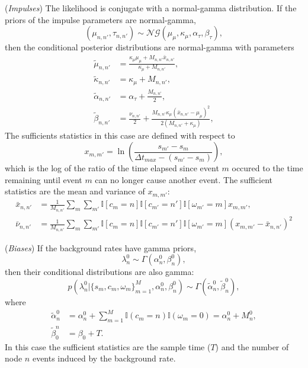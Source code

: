 (\textit{Impulses}) The likelihood is conjugate with a normal-gamma distribution. If the priors of the impulse parameters are normal-gamma,
\begin{equation}
	(\mu_{n,n'}, \tau_{n,n'}) \sim \mathcal{NG} (\mu_\mu, \kappa_\mu, \alpha_\tau, \beta_\tau),
\end{equation}
then the conditional posterior distributions are normal-gamma with parameters
\begin{align}
	\tilde{\mu}_{n,n'} &= \frac{\kappa_\mu \mu_\mu + M_{n,n'}\bar{x}_{n,n'}}{\kappa_\mu + M_{n,n'}}, \\
	\tilde{\kappa}_{n,n'} &= \kappa_{\mu} + M_{n,n'}, \\
	\tilde{\alpha}_{n,n'} &= \alpha_\tau + \frac{M_{n,n'}}{2}, \\
	\tilde{\beta}_{n,n'} &= \frac{\nu_{n,n'}}{2} + \frac{M_{n,n'} \kappa_\mu (\bar{x}_{n,n'} - \mu_\mu)^2}{2(M_{n,n'} + \kappa_\mu)},
\end{align}
The sufficients statistics in this case are defined with respect to
\begin{equation}
	x_{m,m'} = \ln \left( \frac{s_{m'} - s_m}{\Delta t_{max} - (s_{m'} - s_m)} \right),
\end{equation}
which is the log of the ratio of the time elapsed since event $m$ occured to the time remaining until event $m$ can no longer cause another event. The sufficient statistics are the mean and variance of $x_{m,m'}$:
\begin{align}
	\bar{x}_{n,n'} &= \frac{1}{M_{n,n'}} \sum_m \sum_{m'} \mathbb{I}\left[ c_m = n \right] \mathbb{I}\left[ c_{m'} = n' \right] \mathbb{I}\left[ \omega_{m'} = m \right] x_{m,m'}, \\
	\bar{\nu}_{n,n'} &= \frac{1}{M_{n,n'}} \sum_m \sum_{m'} \mathbb{I}\left[ c_m = n \right] \mathbb{I}\left[ c_{m'} = n' \right] \mathbb{I}\left[ \omega_{m'} = m \right] (x_{m,m'} - \bar{x}_{n,n'})^2
\end{align}

(\textit{Biases}) If the background rates have gamma priors,
\begin{equation}
	\lambda_n^{0} \sim \Gamma(\alpha_n^0, \beta_n^0),
\end{equation}
then their conditional distributions are also gamma:
\begin{equation}
	p(\lambda_n^{0} | \{s_m, c_m, \omega_m\}_{m=1}^M, \alpha_n^0, \beta_n^0) \sim \Gamma(\tilde{\alpha}_n^0, \tilde{\beta}_n^0),
\end{equation}
where
\begin{align}
	\tilde{\alpha}_n^0 &= \alpha_n^0 + \sum_{m=1}^M \mathbb{I}(c_m=n) \mathbb{I}(\omega_m=0) = \alpha_n^0 + M_n^0, \\
	\tilde{\beta}_0^n &= \beta_0 + T.
\end{align}
In this case the sufficient statistics are the sample time ($T$) and the number of node $n$ events induced by the background rate.

